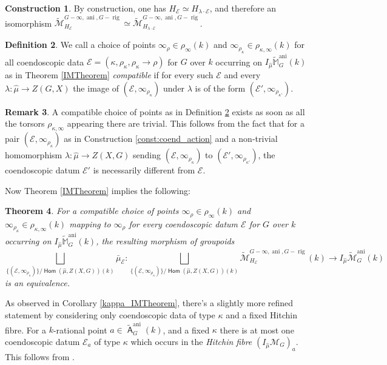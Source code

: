 \documentclass{article}
\DeclareMathOperator{\rig}{rig}
\DeclareMathOperator{\Hom}{\mathsf{Hom}}
\DeclareMathOperator{\A}{\mathsf{A}}
\DeclareMathOperator{\ani}{ani}
\newcommand{\Mc}{\mathcal{M}}
\newcommand{\BM}{{\mathbb{M}}}
\newcommand{\CE}{{\mathcal E}}
\newcommand{\wac}{\widetilde{\A} }
\theoremstyle{definition}
\newtheorem{definition}{Definition}[section]
\newtheorem{construction}[definition]{Construction}
\newtheorem{rmk}[definition]{Remark}
\theoremstyle{plain}
\newtheorem{theorem}[definition]{Theorem}
\begin{document}
\begin{construction}
By construction, one has $H_\CE \simeq H_{\lambda \cdot{} \CE}$, and therefore an isomorphism $\widetilde{\mathcal{M}}^{G-\infty,\ani,G-\rig}_{H_\CE} \simeq \widetilde{\mathcal{M}}^{G-\infty,\ani,G-\rig}_{H_{\lambda \cdot{} \CE}}$.
\end{construction}

\begin{definition} \label{CompChoiceDef}
  We call a choice of points $\infty_\rho \in \rho_\infty(k)$ and $\infty_{\rho_\kappa} \in \rho_{\kappa,\infty}(k)$ for all coendoscopic data $\CE=(\kappa,\rho_\kappa,\rho_\kappa\to \rho)$ for $G$ over $k$ occurring on $I_{\hat\mu}\widetilde\BM^{\ani}_G(k)$ as in Theorem \ref{IMTheorem} \emph{compatible} if for every such $\CE$ and every $\lambda\colon \widehat{\mu} \to Z(G,X)$ the image of $(\CE,\infty_{\rho_\kappa})$ under $\lambda$ is of the form $(\CE',\infty_{\rho_{\kappa'}})$.
\end{definition}
\begin{rmk} \label{CompChoiceRmk}
  A compatible choice of points as in Definition \ref{CompChoiceDef} exists as soon as all the torsors $\rho_{\kappa,\infty}$ appearing there are trivial. This follows from the fact that for a pair $(\CE,\infty_{\rho_\kappa})$ as in Construction \ref{const:coend_action} and a non-trivial homomorphism $\lambda \colon \widehat{\mu} \to Z(X,G)$ sending $(\CE,\infty_{\rho_\kappa})$ to $(\CE',\infty_{\rho_{\kappa'}})$, the coendoscopic datum $\CE'$ is necessarily different from $\CE$.
\end{rmk}
Now Theorem \ref{IMTheorem} implies the following:
\begin{theorem} \label{IMTheoremTwisted}
  For a compatible choice of points $\infty_\rho \in \rho_\infty(k)$ and $\infty_{\rho_\kappa} \in \rho_{\kappa,\infty}(k)$ mapping to $\infty_\rho$ for every coendoscopic datum $\CE$ for $G$ over $k$ occurring on $I_{\hat\mu}\widetilde\BM^{\ani}_G(k)$, the resulting morphism of groupoids
\begin{equation*}
  \bigsqcup_{\{(\CE,\infty_{\rho_\kappa})\}/\Hom(\widehat\mu,Z(X,G))(k)}\bar \mu_\CE \colon  \bigsqcup_{\{(\CE,\infty_{\rho_\kappa})\}/\Hom(\widehat\mu,Z(X,G))(k)} \widetilde{\mathcal{M}}^{G-\infty,\ani,G-\rig}_{H_\CE}(k) \to I_{\hat\mu}\widetilde{\mathcal{M}}^{\ani}_G(k)
\end{equation*}
is an equivalence.
\end{theorem}

As observed in Corollary \ref{kappa_IMTheorem}, there's a slightly more refined statement by considering only coendoscopic data of type $\kappa$ and a fixed Hitchin fibre. For a $k$-rational point $a \in \wac^{\ani}_G(k)$, and a fixed $\kappa$ there is at most one coendoscopic datum $\CE_a$ of type $\kappa$ which occurs in the \emph{Hitchin fibre} $(I_{\hat\mu}\Mc_G)_{a}$. This follows from \cite[Proposition 6.3.3]{MR2653248}.
\end{document}
